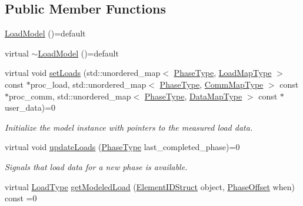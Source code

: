 \subsection*{Public Member Functions}
\begin{DoxyCompactItemize}
\item 
\hyperlink{structvt_1_1vrt_1_1collection_1_1balance_1_1_load_model_a90f345e752441d66b2893027f2626226}{Load\+Model} ()=default
\item 
virtual \hyperlink{structvt_1_1vrt_1_1collection_1_1balance_1_1_load_model_a6478a387f285b322a48ee1d8a80fc6f7}{$\sim$\+Load\+Model} ()=default
\item 
virtual void \hyperlink{structvt_1_1vrt_1_1collection_1_1balance_1_1_load_model_a3de0ef4b35fbdc6e0cb899cfb3cc20ec}{set\+Loads} (std\+::unordered\+\_\+map$<$ \hyperlink{namespacevt_a46ce6733d5cdbd735d561b7b4029f6d7}{Phase\+Type}, \hyperlink{namespacevt_1_1vrt_1_1collection_1_1balance_a5339303db2e1ce964d783a53fd74e6b1}{Load\+Map\+Type} $>$ const $\ast$proc\+\_\+load, std\+::unordered\+\_\+map$<$ \hyperlink{namespacevt_a46ce6733d5cdbd735d561b7b4029f6d7}{Phase\+Type}, \hyperlink{namespacevt_1_1vrt_1_1collection_1_1balance_a01ee1fb0ae2da1d2ab7fdca3be9ae351}{Comm\+Map\+Type} $>$ const $\ast$proc\+\_\+comm, std\+::unordered\+\_\+map$<$ \hyperlink{namespacevt_a46ce6733d5cdbd735d561b7b4029f6d7}{Phase\+Type}, \hyperlink{namespacevt_1_1vrt_1_1collection_1_1balance_acf152c668ed9e2e9c6b29784181d2435}{Data\+Map\+Type} $>$ const $\ast$user\+\_\+data)=0
\begin{DoxyCompactList}\small\item\em Initialize the model instance with pointers to the measured load data. \end{DoxyCompactList}\item 
virtual void \hyperlink{structvt_1_1vrt_1_1collection_1_1balance_1_1_load_model_a4f1c6fb5d7d7a0b147755f025b1d5f5c}{update\+Loads} (\hyperlink{namespacevt_a46ce6733d5cdbd735d561b7b4029f6d7}{Phase\+Type} last\+\_\+completed\+\_\+phase)=0
\begin{DoxyCompactList}\small\item\em Signals that load data for a new phase is available. \end{DoxyCompactList}\item 
virtual \hyperlink{namespacevt_a8fb51741340b87d7aaee0bef60e9896b}{Load\+Type} \hyperlink{structvt_1_1vrt_1_1collection_1_1balance_1_1_load_model_a92ee655e6f22652e798151ad5c698ba2}{get\+Modeled\+Load} (\hyperlink{namespacevt_1_1vrt_1_1collection_1_1balance_a9f5b53fafb270212279a4757d2c4cd28}{Element\+I\+D\+Struct} object, \hyperlink{structvt_1_1vrt_1_1collection_1_1balance_1_1_phase_offset}{Phase\+Offset} when) const =0

\end{DoxyCompactItemize}

